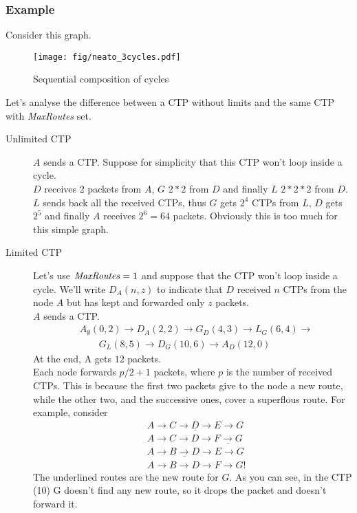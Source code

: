 \documentclass[a4paper]{article}
\begin{document}
\subsubsection*{Example}
Consider this graph.
\begin{figure}[h]
	\begin{center}
		\texttt{[image: fig/neato\_3cycles.pdf]}
	\end{center}
	\caption{Sequential composition of cycles}
	\label{fig:q2_scalability_example}
\end{figure}
Let's analyse the difference between a CTP without limits and the same CTP
with \emph{MaxRoutes} set.
\begin{description}
	\item[Unlimited CTP] $A$ sends a CTP. Suppose for simplicity that
		this CTP won't loop inside a cycle.\\
		$D$ receives $2$ packets from $A$, $G$ $2*2$ from $D$ and
		finally $L$ $2*2*2$ from $D$.\\
		$L$ sends back all the received CTPs, thus $G$ gets $2^4$ CTPs
		from $L$, $D$ gets $2^5$ and finally $A$ receives $2^6=64$
		packets.
		Obviously this is too much for this simple graph.
	\item[Limited CTP] Let's use $\textrm{\emph{MaxRoutes}}=1$ and suppose
		that the CTP won't loop inside a cycle. We'll write
		$D_A(n,z)$ to indicate that $D$ received $n$ CTPs from the node
		$A$ but has kept and forwarded only $z$ packets.\\
		$A$ sends a CTP.\\
		\begin{align*}
			&A_{\emptyset}(0,2) \rightarrow	D_A(2,2)\rightarrow
			G_D(4,3) \rightarrow L_G(6,4) \rightarrow \\
			& \qquad G_L(8,5) \rightarrow D_G(10, 6) \rightarrow
			A_D(12, 0)
		\end{align*}
		At the end, A gets $12$ packets.\\
		Each node forwards $p/2+1$ packets, where $p$ is the number of
		received CTPs. This is because the first two packets give to
		the node a new route, while the other two, and the successive
		ones, cover a superflous route. For example, consider
		\begin{align}	
			&\underline{A \rightarrow  C \rightarrow D \rightarrow
			E \rightarrow  G} \label{eq:d1}\\
			&A \rightarrow  C \rightarrow D \rightarrow
			\underline{F \rightarrow  G} \label{eq:d2}\\
			&A \rightarrow  \underline{B \rightarrow D} \rightarrow
			E \rightarrow  G \label{eq:d3}\\
			&A \rightarrow B \rightarrow D \rightarrow F
			\rightarrow  G \mathbb{!}\label{eq:d4}
		\end{align}
		The underlined routes are the new route for $G$. As you can
		see, in the CTP (10) G doesn't find any new route, so
		it drops the packet and doesn't forward it.
	\end{description}
\end{document}
